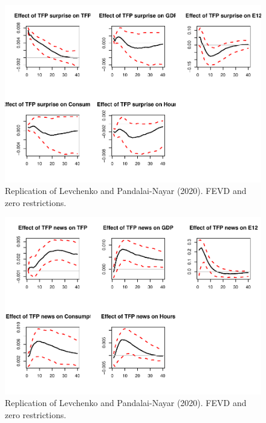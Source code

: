 \documentclass[
  12pt,
]{book}
\newenvironment{Shaded}{\begin{snugshade}}{\end{snugshade}}
\newcommand{\CommentTok}[1]{\textcolor[rgb]{0.56,0.35,0.01}{\textit{#1}}}
\newcommand{\DecValTok}[1]{\textcolor[rgb]{0.00,0.00,0.81}{#1}}
\newcommand{\FunctionTok}[1]{\textcolor[rgb]{0.13,0.29,0.53}{\textbf{#1}}}
\newcommand{\NormalTok}[1]{#1}
\newcommand{\OtherTok}[1]{\textcolor[rgb]{0.56,0.35,0.01}{#1}}
\newcommand{\SpecialCharTok}[1]{\textcolor[rgb]{0.81,0.36,0.00}{\textbf{#1}}}
\theoremstyle{definition}
\theoremstyle{definition}
\theoremstyle{definition}
\theoremstyle{definition}
\theoremstyle{remark}
\begin{document}
\begin{figure}
\includegraphics[width=0.95\linewidth]{IdentifStructShocks_files/figure-latex/levchenko-1} \caption{Replication of Levchenko and Pandalai-Nayar (2020). FEVD and zero restrictions.}\label{fig:levchenko-1}
\end{figure}
\begin{figure}
\includegraphics[width=0.95\linewidth]{IdentifStructShocks_files/figure-latex/levchenko-2} \caption{Replication of Levchenko and Pandalai-Nayar (2020). FEVD and zero restrictions.}\label{fig:levchenko-2}
\end{figure}

\begin{Shaded}
\end{Shaded}
\end{document}
